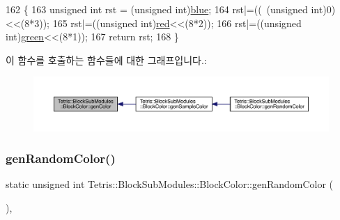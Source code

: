 \begin{DoxyCode}
162                                                                                                    \{
163                 \textcolor{keywordtype}{unsigned} \textcolor{keywordtype}{int} rst = (\textcolor{keywordtype}{unsigned} int)\hyperlink{class_tetris_1_1_block_sub_modules_1_1_block_color_af04e78b9a1c2f7625863c289c4a741e3}{blue};
164                 rst|=((~(\textcolor{keywordtype}{unsigned} int)0)<<(8*3));
165                 rst|=((\textcolor{keywordtype}{unsigned} int)\hyperlink{class_tetris_1_1_block_sub_modules_1_1_block_color_af8a0dc372e7dbab300290eadada8ef49}{red}<<(8*2));
166                 rst|=((\textcolor{keywordtype}{unsigned} int)\hyperlink{class_tetris_1_1_block_sub_modules_1_1_block_color_a4b28885bfd8bf53793c6b3daedd974eb}{green}<<(8*1));
167                 \textcolor{keywordflow}{return} rst;
168             \}
\end{DoxyCode}
이 함수를 호출하는 함수들에 대한 그래프입니다.\+:
\nopagebreak
\begin{figure}[H]
\begin{center}
\leavevmode
\includegraphics[width=350pt]{de/d44/class_tetris_1_1_block_sub_modules_1_1_block_color_a479cf23117afea6237a4fd69bc4652ba_icgraph}
\end{center}
\end{figure}
\mbox{\label{class_tetris_1_1_block_sub_modules_1_1_block_color_a74374a6d24cd77c7f4fe03e19111bab7}} 
\subsubsection{\texorpdfstring{gen\+Random\+Color()}{genRandomColor()}}
{\footnotesize\ttfamily static unsigned int Tetris\+::\+Block\+Sub\+Modules\+::\+Block\+Color\+::gen\+Random\+Color (\begin{DoxyParamCaption}{ }\end{DoxyParamCaption})\hspace{0.3cm}{\ttfamily [inline]}, {\ttfamily [static]}}



